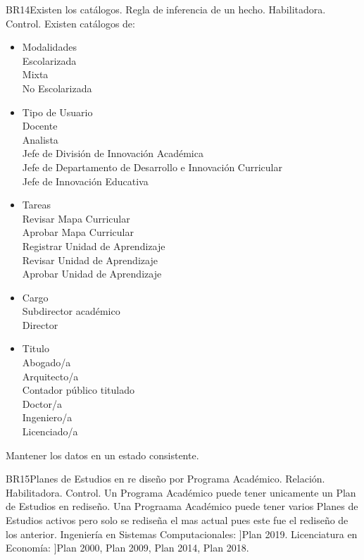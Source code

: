 \begin{BussinesRule}{BR14}{Existen los catálogos.}
    \BRitem[Tipo: ]Regla de inferencia de un hecho.
    \BRitem[Clase: ]Habilitadora.
    \BRitem[Nivel: ]Control.
    \BRitem[Descripción: ]Existen catálogos de:
    \begin{itemize}
        \item Modalidades\\
            Escolarizada\\
            Mixta\\
            No Escolarizada
        \item Tipo de Usuario\\
            Docente\\
            Analista\\
            Jefe de División de Innovación Académica\\
            Jefe de Departamento de Desarrollo e Innovación Curricular\\
            Jefe de Innovación Educativa
        \item Tareas\\
            Revisar Mapa Curricular\\
            Aprobar Mapa Curricular\\
            Registrar Unidad de Aprendizaje\\
            Revisar Unidad de Aprendizaje\\
            Aprobar Unidad de Aprendizaje
        \item Cargo\\
            Subdirector académico\\
            Director
        \item Titulo\\
            Abogado/a\\
            Arquitecto/a\\
            Contador público titulado\\
            Doctor/a\\
            Ingeniero/a\\
            Licenciado/a\\
    \end{itemize}
    \BRitem[Motivación: ]Mantener los datos en un estado consistente.
\end{BussinesRule}

\begin{BussinesRule}{BR15}{Planes de Estudios en re diseño por Programa Académico.}
    \BRitem[Tipo:] Relación.
    \BRitem[Clase:] Habilitadora.
    \BRitem[Nivel:] Control.
    \BRitem[Descripción:] Un Programa Académico puede tener unicamente un Plan de Estudios en rediseño.
    \BRitem[Motivación: ]Una Prograama Académico puede tener varios Planes de Estudios activos pero solo se rediseña el mas actual pues este fue el rediseño de los anterior.
     Ingeniería en Sistemas Computacionales: ]Plan 2019.
     Licenciatura en Economía: ]Plan 2000, Plan 2009, Plan 2014, Plan 2018.
\end{BussinesRule}

